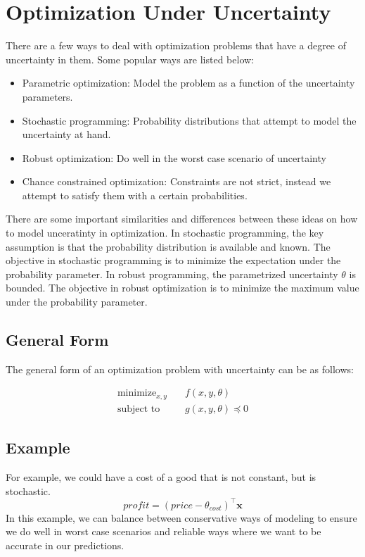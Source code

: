 \section{Optimization Under Uncertainty}
There are a few ways to deal with optimization problems that have a degree of uncertainty in them.
Some popular ways are listed below: 
\begin{itemize}
    \item Parametric optimization: Model the problem as a function of the uncertainty parameters.
    \item Stochastic programming: Probability distributions that attempt to model the uncertainty at hand.
    \item Robust optimization: Do well in the worst case scenario of uncertainty
    \item Chance constrained optimization: Constraints are not strict, instead we attempt to satisfy them with a certain probabilities.
\end{itemize}
There are some important similarities and differences between these ideas on how to model unceratinty in optimization.
In stochastic programming, the key assumption is that the probability distribution is available and known.
The objective in stochastic programming is to minimize the expectation under the probability parameter.
In robust programming, the parametrized uncertainty $\theta$ is bounded.
The objective in robust optimization is to minimize the maximum value under the probability parameter.

\subsection{General Form}
The general form of an optimization problem with uncertainty can be as follows:

\begin{align}
  \text{minimize}_{x,y} & \quad f(x,y,\theta) \\
  \text{subject to} & \quad g(x,y,\theta) \preceq 0
\end{align}
\subsection{Example}
For example, we could have a cost of a good that is not constant, but is stochastic.
\begin{equation}
    profit = (price - \theta_{cost})^\top \textbf{x}
\end{equation}
In this example, we can balance between conservative ways of modeling to ensure we do well in worst case scenarios and reliable ways where we want to be accurate in our predictions.

